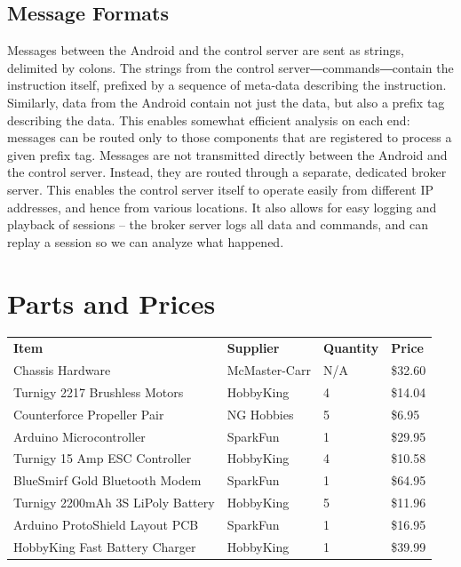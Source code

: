 \documentclass[letterpaper]{article}
\begin{document}
\subsection{Message Formats}
‏Messages between the Android and the control server are sent as
strings,‭ ‬delimited by colons.‭ ‬The strings from the control
server―commands―contain the instruction itself,‭ ‬prefixed by a sequence
of meta-data describing the instruction.‭ ‬Similarly,‭ ‬data from the
Android contain not just the data,‭ ‬but also a prefix tag describing
the data.‭ ‬This enables somewhat efficient analysis on each end:‭
‬messages can be routed only to those components that are registered to
process a given prefix tag.  Messages are not transmitted directly
between the Android and the control server.‭ ‬Instead,‭ ‬they are routed
through a separate,‭ ‬dedicated broker server.‭ ‬This enables the control
server itself to operate easily from different IP addresses,‭ ‬and hence
from various locations. It also allows for easy logging and playback
of sessions -- the broker server logs all data and commands, and can
replay a session so we can analyze what happened.

\newpage
\appendix
\section{Parts and Prices}
\label{tab:parts}
\begin{tabular}{llll}
  \textbf{Item} & \textbf{Supplier}
  & \textbf{Quantity} & \textbf{Price} \\

  Chassis Hardware & McMaster-Carr & N/A & \$32.60 \\
  Turnigy 2217 Brushless Motors & HobbyKing & 4 & \$14.04 \\
  Counterforce Propeller Pair & NG Hobbies & 5 & \$6.95 \\
  Arduino Microcontroller & SparkFun & 1 & \$29.95 \\
  Turnigy 15 Amp ESC Controller & HobbyKing & 4 & \$10.58 \\
  BlueSmirf Gold Bluetooth Modem & SparkFun & 1 & \$64.95 \\
  Turnigy 2200mAh 3S LiPoly Battery & HobbyKing & 5 & \$11.96 \\
  Arduino ProtoShield Layout PCB & SparkFun & 1 & \$16.95 \\
  HobbyKing Fast Battery Charger & HobbyKing & 1 & \$39.99 \\
  
\end{tabular}
\end{document}
